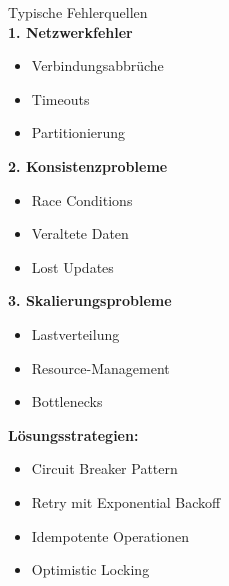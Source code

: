 \begin{KR}{Typische Fehlerquellen}\\
\textbf{1. Netzwerkfehler}
\begin{itemize}
    \item Verbindungsabbrüche
    \item Timeouts
    \item Partitionierung
\end{itemize}

\textbf{2. Konsistenzprobleme}
\begin{itemize}
    \item Race Conditions
    \item Veraltete Daten
    \item Lost Updates
\end{itemize}

\textbf{3. Skalierungsprobleme}
\begin{itemize}
    \item Lastverteilung
    \item Resource-Management
    \item Bottlenecks
\end{itemize}

\textbf{Lösungsstrategien:}
\begin{itemize}
    \item Circuit Breaker Pattern
    \item Retry mit Exponential Backoff
    \item Idempotente Operationen
    \item Optimistic Locking
\end{itemize}
\end{KR}


\columnbreak


